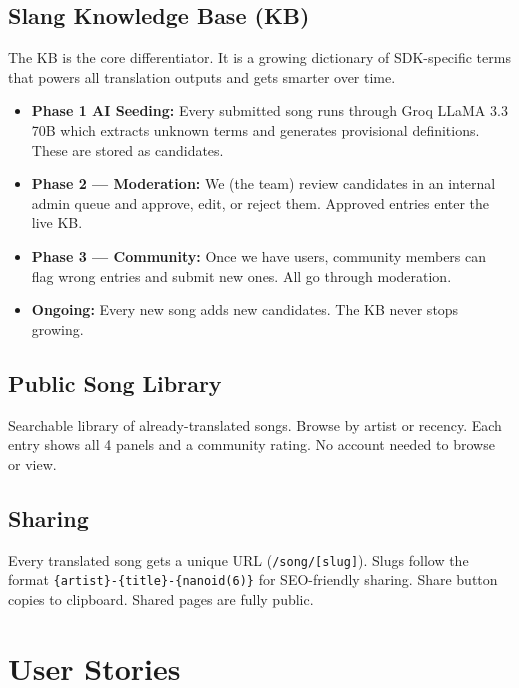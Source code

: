\documentclass[12pt, a4paper]{article}
\begin{document}
\subsection{Slang Knowledge Base (KB)}

The KB is the core differentiator. It is a growing dictionary of SDK-specific
terms that powers all translation outputs and gets smarter over time.

\begin{tcolorbox}[prdbox, title={KB Strategy: AI-First, Community-Validated}]
\begin{itemize}
  \item \textbf{Phase 1 \textemdash{} AI Seeding:} Every submitted song runs through
        Groq LLaMA 3.3 70B which extracts unknown terms and generates provisional
        definitions. These are stored as candidates.
  \item \textbf{Phase 2 — Moderation:} We (the team) review candidates
        in an internal admin queue and approve, edit, or reject them.
        Approved entries enter the live KB.
  \item \textbf{Phase 3 — Community:} Once we have users, community members
        can flag wrong entries and submit new ones. All go through moderation.
  \item \textbf{Ongoing:} Every new song adds new candidates. The KB never
        stops growing.
\end{itemize}
\end{tcolorbox}

\subsection{Public Song Library}

Searchable library of already-translated songs. Browse by artist or recency.
Each entry shows all 4 panels and a community rating. No account needed to
browse or view.

\subsection{Sharing}

Every translated song gets a unique URL (\texttt{/song/[slug]}). Slugs follow
the format \texttt{\{artist\}-\{title\}-\{nanoid(6)\}} for SEO-friendly sharing.
Share button copies to clipboard. Shared pages are fully public.

\section{User Stories}
\end{document}
